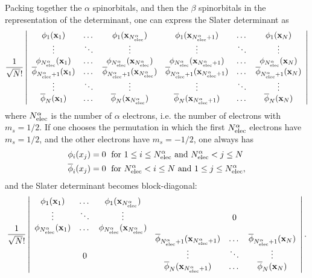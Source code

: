 \documentclass[./thesis.tex]{subfiles}
\begin{document}
Packing together the $\alpha$ spinorbitals, and then the $\beta$ spinorbitals in the representation of
the determinant, one can express the Slater determinant as
\begin{equation}
\frac{1}{\sqrt{N}!} \left|
 \begin{array}{cccccc}
 \phi_1({\bf x}_1)  & \dots & \phi_1({\bf x}_{{N_\text{elec}^\alpha}}) & \phi_1({\bf x}_{{N_\text{elec}^\alpha}+1}) & \dots & \phi_1({\bf x}_{N}) \\
 \vdots             & \ddots& \vdots                    & \vdots                      &\ddots & \vdots  \\         
 \phi_{{N_\text{elec}^\alpha}}({\bf x}_1)  & \dots & \phi_{{N_\text{elec}^\alpha}}({\bf x}_{{N_\text{elec}^\alpha}}) & \phi_{{N_\text{elec}^\alpha}}({\bf x}_{{N_\text{elec}^\alpha}+1}) & \dots & \phi_{{N_\text{elec}^\alpha}}({\bf x}_{N}) \\
 \overline{\phi}_{{N_\text{elec}^\alpha}+1}({\bf x}_1)  & \dots & \overline{\phi}_{{N_\text{elec}^\alpha}+1}({\bf x}_{{N_\text{elec}^\alpha}}) & \overline{\phi}_{{N_\text{elec}^\alpha}+1}({\bf x}_{{N_\text{elec}^\alpha}+1}) & \dots & \overline{\phi}_{{N_\text{elec}^\alpha}+1}({\bf x}_{N}) \\
 \vdots             & \ddots& \vdots                    & \vdots                      &\ddots & \vdots  \\         
 \overline{\phi}_{N}({\bf x}_1)  & \dots & \overline{\phi}_{N}({\bf x}_{{N_\text{elec}^\alpha}}) & \overline{\phi}_{N}({\bf x}_{{N_\text{elec}^\alpha}+1}) & \dots & \overline{\phi}_{N}({\bf x}_{N}) \\
 \end{array}
\right| 
\end{equation}
where ${N_\text{elec}^\alpha}$ is the number of $\alpha$ electrons, i.e. the number of electrons with $m_s=1/2$.
If one chooses the permutation in which the first ${N_\text{elec}^\alpha}$ electrons have $m_s=1/2$, and the other electrons have $m_s=-1/2$, one always has
\begin{align}
\phi_i(x_j) & = 0 \; \text{ for } 1 \le i \le {N_\text{elec}^\alpha} \text{ and } {N_\text{elec}^\alpha} < j \le N \\ \nonumber
\overline{\phi}_i(x_j) & = 0 \; \text{ for }  {N_\text{elec}^\alpha} < i \le N \text{ and }  1 \le j \le {N_\text{elec}^\alpha},
\end{align}
and the Slater determinant becomes block-diagonal:
\begin{equation}
\frac{1}{\sqrt{N}!} \left|
 \begin{array}{cccccc}
 \phi_1({\bf x}_1)  & \dots & \phi_1({\bf x}_{{N_\text{elec}^\alpha}}) &   & &   \\
 \vdots             &\ddots & \vdots                    & &  0    & \\         
 \phi_{{N_\text{elec}^\alpha}}({\bf x}_1)  & \dots & \phi_{{N_\text{elec}^\alpha}}({\bf x}_{{N_\text{elec}^\alpha}}) &   & &   \\
   & & & \overline{\phi}_{{N_\text{elec}^\alpha}+1}({\bf x}_{{N_\text{elec}^\alpha}+1}) & \dots & \overline{\phi}_{{N_\text{elec}^\alpha}+1}({\bf x}_{N}) \\
 & 0 & & \vdots                      &\ddots & \vdots  \\         
   & &   & \overline{\phi}_{N}({\bf x}_{{N_\text{elec}^\alpha}+1}) & \dots & \overline{\phi}_{N}({\bf x}_{N}) \\
 \end{array}
\right|. 
\end{equation}
\end{document}
